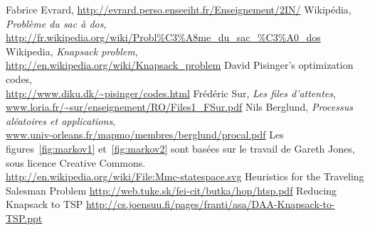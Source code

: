   Fabrice Evrard, \url{http://evrard.perso.enseeiht.fr/Enseignement/2IN/}
  Wikipédia, \emph{Problème du sac à dos},\\
  \url{http://fr.wikipedia.org/wiki/Probl\%C3\%A8me_du_sac_\%C3\%A0_dos}
  Wikipedia, \emph{Knapsack problem},\\
  \url{http://en.wikipedia.org/wiki/Knapsack_problem}
  David Pisinger's optimization codes,\\
  \url{http://www.diku.dk/~pisinger/codes.html}
  Frédéric Sur, \emph{Les files d'attentes}, \\
  \url{www.loria.fr/~sur/enseignement/RO/Files1_FSur.pdf}
  Nils Berglund, \emph{Processus aléatoires et applications}, \\
  \url{www.univ-orleans.fr/mapmo/membres/berglund/procal.pdf}
  Les figures~\ref{fig:markov1} et~\ref{fig:markov2} sont basées sur le travail
  de Gareth Jones, sous licence Creative Commons.\\
  \url{http://en.wikipedia.org/wiki/File:Mmc-statespace.svg}
   Heuristics for the Traveling Salesman Problem
   \url{http://web.tuke.sk/fei-cit/butka/hop/htsp.pdf}
   Reducing Knapsack to TSP
   \url{http://cs.joensuu.fi/pages/franti/asa/DAA-Knapsack-to-TSP.ppt}

